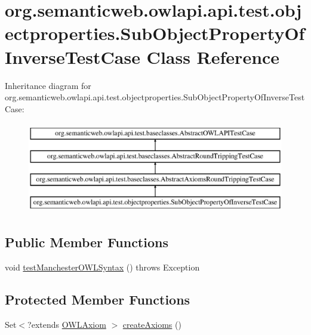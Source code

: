 \hypertarget{classorg_1_1semanticweb_1_1owlapi_1_1api_1_1test_1_1objectproperties_1_1_sub_object_property_of_inverse_test_case}{\section{org.\-semanticweb.\-owlapi.\-api.\-test.\-objectproperties.\-Sub\-Object\-Property\-Of\-Inverse\-Test\-Case Class Reference}
\label{classorg_1_1semanticweb_1_1owlapi_1_1api_1_1test_1_1objectproperties_1_1_sub_object_property_of_inverse_test_case}
}
Inheritance diagram for org.\-semanticweb.\-owlapi.\-api.\-test.\-objectproperties.\-Sub\-Object\-Property\-Of\-Inverse\-Test\-Case\-:\begin{figure}[H]
\begin{center}
\leavevmode
\includegraphics[height=4.000000cm]{classorg_1_1semanticweb_1_1owlapi_1_1api_1_1test_1_1objectproperties_1_1_sub_object_property_of_inverse_test_case}
\end{center}
\end{figure}
\subsection*{Public Member Functions}
\begin{DoxyCompactItemize}
\item 
void \hyperlink{classorg_1_1semanticweb_1_1owlapi_1_1api_1_1test_1_1objectproperties_1_1_sub_object_property_of_inverse_test_case_ac6fd44b7f726f03348ceb9556bfe39d4}{test\-Manchester\-O\-W\-L\-Syntax} ()  throws Exception 
\end{DoxyCompactItemize}
\subsection*{Protected Member Functions}
\begin{DoxyCompactItemize}
\item 
Set$<$?extends \hyperlink{interfaceorg_1_1semanticweb_1_1owlapi_1_1model_1_1_o_w_l_axiom}{O\-W\-L\-Axiom} $>$ \hyperlink{classorg_1_1semanticweb_1_1owlapi_1_1api_1_1test_1_1objectproperties_1_1_sub_object_property_of_inverse_test_case_ab7159392eb9c44f755c12aff74bcbdb6}{create\-Axioms} ()
\end{DoxyCompactItemize}


